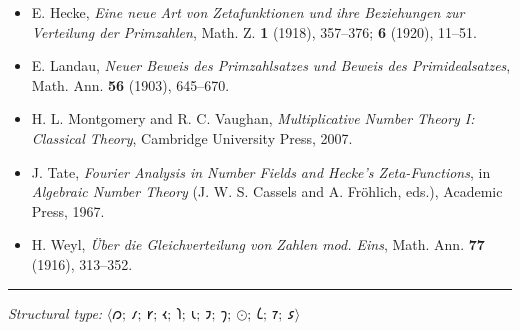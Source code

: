 \documentclass[12pt,a4paper]{article}
\begin{document}
\begin{itemize}
    \item E. Hecke, \emph{Eine neue Art von Zetafunktionen und ihre Beziehungen zur Verteilung der Primzahlen}, Math. Z. \textbf{1} (1918), 357--376; \textbf{6} (1920), 11--51.
    \item E. Landau, \emph{Neuer Beweis des Primzahlsatzes und Beweis des Primidealsatzes}, Math. Ann. \textbf{56} (1903), 645--670.
    \item H. L. Montgomery and R. C. Vaughan, \emph{Multiplicative Number Theory I: Classical Theory}, Cambridge University Press, 2007.
    \item J. Tate, \emph{Fourier Analysis in Number Fields and Hecke's Zeta-Functions}, in \emph{Algebraic Number Theory} (J. W. S. Cassels and A. Fröhlich, eds.), Academic Press, 1967.
    \item H. Weyl, \emph{Über die Gleichverteilung von Zahlen mod. Eins}, Math. Ann. \textbf{77} (1916), 313--352.
\end{itemize}

\begin{center}
\rule{0.5\textwidth}{0.4pt}
\end{center}

\emph{Structural type:} $\langle 𐑼;\ 𐑥;\ 𐑾;\ 𐑬;\ 𐑐;\ 𐑧;\ 𐑲;\ 𐑠;\ {\odot};\ 𐑖;\ 𐑳;\ 𐑭 \rangle$
\end{document}
